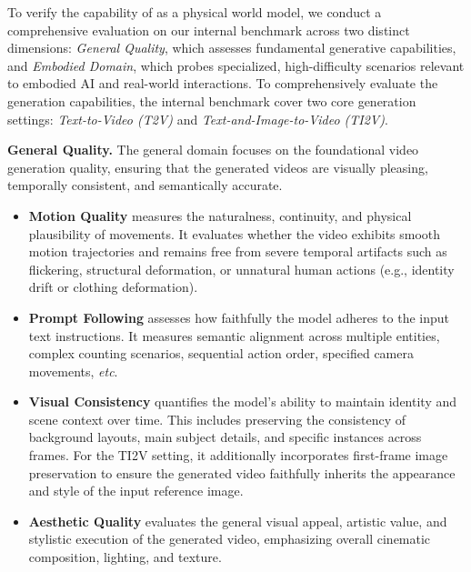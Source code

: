To verify the capability of \method as a physical world model, we conduct a comprehensive evaluation on our internal benchmark across two distinct dimensions: \textit{General Quality}, which assesses fundamental generative capabilities, and \textit{Embodied Domain}, which probes specialized, high-difficulty scenarios relevant to embodied AI and real-world interactions. 
To comprehensively evaluate the generation capabilities, the internal benchmark cover two core generation settings: \textit{Text-to-Video (T2V)} and \textit{Text-and-Image-to-Video (TI2V)}.

\noindent\textbf{General Quality.}
The general domain focuses on the foundational video generation quality, ensuring that the generated videos are visually pleasing, temporally consistent, and semantically accurate.
\begin{itemize}
  \item \textbf{Motion Quality} measures the naturalness, continuity, and physical plausibility of movements.
  It evaluates whether the video exhibits smooth motion trajectories and remains free from severe temporal artifacts such as flickering, structural deformation, or unnatural human actions (e.g., identity drift or clothing deformation).

  \item \textbf{Prompt Following} assesses how faithfully the model adheres to the input text instructions.
  It measures semantic alignment across multiple entities, complex counting scenarios, sequential action order, specified camera movements, \textit{etc}.

  \item \textbf{Visual Consistency} quantifies the model's ability to maintain identity and scene context over time.
  This includes preserving the consistency of background layouts, main subject details, and specific instances across frames.
  For the TI2V setting, it additionally incorporates first-frame image preservation to ensure the generated video faithfully inherits the appearance and style of the input reference image.

  \item \textbf{Aesthetic Quality} evaluates the general visual appeal, artistic value, and stylistic execution of the generated video, emphasizing overall cinematic composition, lighting, and texture.
\end{itemize}

